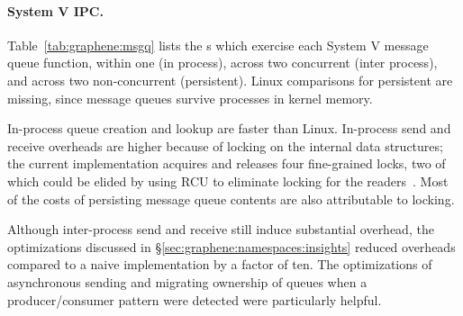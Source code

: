 \paragraph{System V IPC.}
Table~\ref{tab:graphene:msgq} lists the \microbench{}s
which exercise each System V message queue function,
within one \picoproc{} (in process), across two concurrent \picoprocs{} (inter process),
and across two non-concurrent \picoprocs{} (persistent).
Linux comparisons for persistent are missing, since message queues 
survive processes in kernel memory.

In-process queue creation and lookup are faster than Linux.
In-process send and receive overheads are higher
because of locking on the internal data structures; the current implementation acquires and releases four
fine-grained locks, two of which could be elided by using RCU to eliminate locking for the readers~\citep{mckenney04rcu}.
Most of the costs of persisting message queue contents are also attributable to locking.

Although inter-process send and receive still induce substantial overhead, the optimizations
discussed in \S\ref{sec:graphene:namespaces:insights} reduced overheads compared to a naive implementation
by a factor of ten.  The optimizations of asynchronous sending and migrating ownership of queues
when a producer/consumer pattern were detected were particularly helpful.



